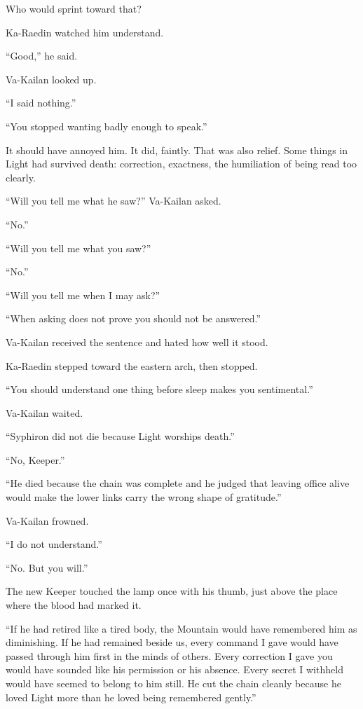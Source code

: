 Who would sprint toward that?\par
Ka-Raedin watched him understand.\par
“Good,” he said.\par
Va-Kailan looked up.\par
“I said nothing.”\par
“You stopped wanting badly enough to speak.”\par
It should have annoyed him.
It did, faintly.
That was also relief.
Some things in Light had survived death: correction, exactness, the humiliation of being read too clearly.\par
“Will you tell me what he saw?” Va-Kailan asked.\par
“No.”\par
“Will you tell me what you saw?”\par
“No.”\par
“Will you tell me when I may ask?”\par
“When asking does not prove you should not be answered.”\par
Va-Kailan received the sentence and hated how well it stood.\par
Ka-Raedin stepped toward the eastern arch, then stopped.\par
“You should understand one thing before sleep makes you sentimental.”\par
Va-Kailan waited.\par
“Syphiron did not die because Light worships death.”\par
“No, Keeper.”\par
“He died because the chain was complete and he judged that leaving office alive would make the lower links carry the wrong shape of gratitude.”\par
Va-Kailan frowned.\par
“I do not understand.”\par
“No.
But you will.”\par
The new Keeper touched the lamp once with his thumb, just above the place where the blood had marked it.\par
“If he had retired like a tired body, the Mountain would have remembered him as diminishing.
If he had remained beside us, every command I gave would have passed through him first in the minds of others.
Every correction I gave you would have sounded like his permission or his absence.
Every secret I withheld would have seemed to belong to him still.
He cut the chain cleanly because he loved Light more than he loved being remembered gently.”\par
